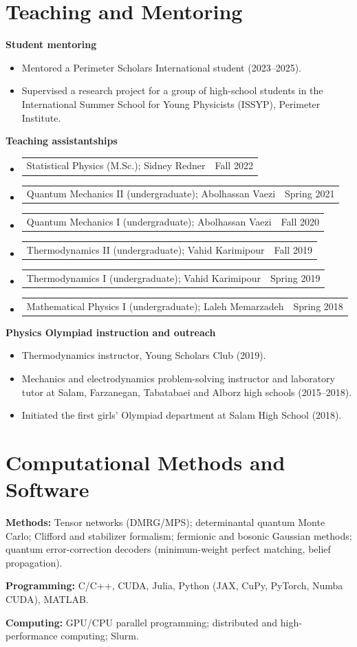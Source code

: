 \documentclass[10pt,letterpaper]{article}
\makeatletter
\newcommand{\dated}[2]{\begin{tabularx}{\linewidth}{@{}Xr@{}}#1 & \textcolor{muted}{#2}\\\end{tabularx}}
\makeatother
\begin{document}
\section{Teaching and Mentoring}
\textbf{Student mentoring}\par
\begin{itemize}
\item Mentored a Perimeter Scholars International student (2023--2025).
\item Supervised a research project for a group of high-school students in the International Summer School for Young Physicists (ISSYP), Perimeter Institute.
\end{itemize}
\vspace{6pt}
\textbf{Teaching assistantships}\par
\begin{itemize}[itemsep=4pt]
\item \dated{Statistical Physics (M.Sc.); Sidney Redner}{Fall 2022}
\item \dated{Quantum Mechanics II (undergraduate); Abolhassan Vaezi}{Spring 2021}
\item \dated{Quantum Mechanics I (undergraduate); Abolhassan Vaezi}{Fall 2020}
\item \dated{Thermodynamics II (undergraduate); Vahid Karimipour}{Fall 2019}
\item \dated{Thermodynamics I (undergraduate); Vahid Karimipour}{Spring 2019}
\item \dated{Mathematical Physics I (undergraduate); Laleh Memarzadeh}{Spring 2018}
\end{itemize}
\vspace{8pt}
\textbf{Physics Olympiad instruction and outreach}\par
\begin{itemize}
\item Thermodynamics instructor, Young Scholars Club (2019).
\item Mechanics and electrodynamics problem-solving instructor and laboratory tutor at Salam, Farzanegan, Tabatabaei and Alborz high schools (2015--2018).
\item Initiated the first girls' Olympiad department at Salam High School (2018).
\end{itemize}

\section{Computational Methods and Software}
\textbf{Methods:} Tensor networks (DMRG/MPS); determinantal quantum Monte Carlo; Clifford and stabilizer formalism; fermionic and bosonic Gaussian methods; quantum error-correction decoders (minimum-weight perfect matching, belief propagation).\par
\vspace{6pt}
\textbf{Programming:} C/C++, CUDA, Julia, Python (JAX, CuPy, PyTorch, Numba CUDA), MATLAB.\par
\vspace{6pt}
\textbf{Computing:} GPU/CPU parallel programming; distributed and high-performance computing; Slurm.
\end{document}
